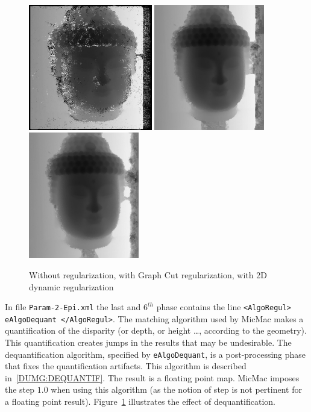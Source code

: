 \begin{figure}
\begin{center}
\includegraphics[height=55mm]{FIGS/Boudhas/Px1_MR_Num5.jpg}
\includegraphics[height=55mm]{FIGS/Boudhas/Px1_REGUL_Num5.jpg}
\includegraphics[height=55mm]{FIGS/Boudhas/PX1-Regul-ProgDyn.jpg}
\caption{Without regularization, with Graph Cut regularization, 
with 2D dynamic regularization}
\label{FIG:DISP:REGUL}
\end{center}
\end{figure}


In file {\tt Param-2-Epi.xml} the last and $6^{th}$ phase contains
the line {\tt <AlgoRegul>    eAlgoDequant    </AlgoRegul>}.
The matching algorithm used by MicMac makes a quantification
of the disparity (or depth, or height \dots, according to the geometry). 
This quantification creates jumps in the results that may be undesirable.
The dequantification algorithm, specified by {\tt  eAlgoDequant}, is
a post-processing phase that fixes 
the quantification artifacts.
This algorithm is described in~\ref{DUMG:DEQUANTIF}. The result is
a floating point map. MicMac imposes the step $1.0$ when using this algorithm
(as the notion of step is not pertinent for a floating point
result). Figure~\ref{FIG:DISP:REGUL} illustrates the effect of dequantification.




